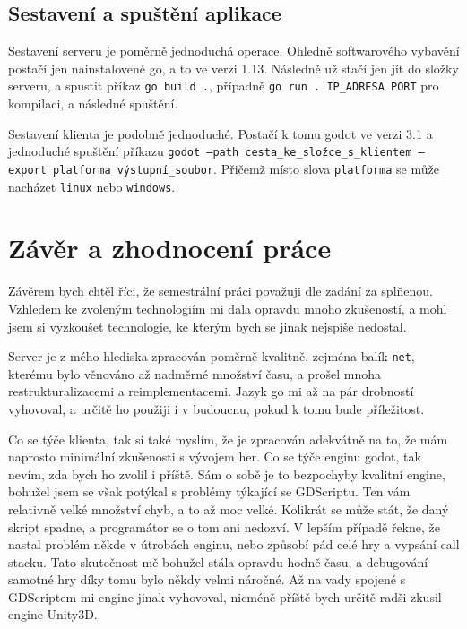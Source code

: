 \documentclass[12pt, a4paper]{article}
\begin{document}
    \subsection{Sestavení a spuštění aplikace}
    Sestavení serveru je poměrně jednoduchá operace.
    Ohledně softwarového vybavění postačí jen nainstalovené go, a to ve verzi 1.13.
    Následně už stačí jen jít do složky serveru, a spustit příkaz \texttt{go build .}, případně \texttt{go run . IP\_ADRESA PORT} pro kompilaci, a následné spuštění.

    Sestavení klienta je podobně jednoduché.
    Postačí k tomu godot ve verzi 3.1 a jednoduché spuštění příkazu \texttt{godot --path cesta\_ke\_složce\_s\_klientem --export platforma výstupní\_soubor}.
    Přičemž místo slova \texttt{platforma} se může nacházet \texttt{linux} nebo \texttt{windows}.

    \section{Závěr a zhodnocení práce}
    Závěrem bych chtěl říci, že semestrální práci považuji dle zadání za splňenou.
    Vzhledem ke zvoleným technologiím mi dala opravdu mnoho zkušeností, a mohl jsem si vyzkoušet technologie, ke kterým bych se jinak nejspíše nedostal.

    Server je z mého hlediska zpracován poměrně kvalitně, zejména balík \texttt{net}, kterému bylo věnováno až nadměrné množství času, a prošel mnoha restrukturalizacemi a reimplementacemi.
    Jazyk go mi až na pár drobností vyhovoval, a určitě ho použiji i v budoucnu, pokud k tomu bude příležitost.

    Co se týče klienta, tak si také myslím, že je zpracován adekvátně na to, že mám naprosto minimální zkušenosti s vývojem her.
    Co se týče enginu godot, tak nevím, zda bych ho zvolil i příště.
    Sám o sobě je to bezpochyby kvalitní engine, bohužel jsem se však potýkal s problémy týkající se GDScriptu.
    Ten vám  relativně velké množství chyb, a to až moc velké.
    Kolikrát se může stát, že daný skript spadne, a programátor se o tom ani nedozví.
    V lepším případě řekne, že nastal problém někde v útrobách enginu, nebo způsobí pád celé hry a vypsání call stacku.
    Tato skutečnost mě bohužel stála opravdu hodně času, a debugování samotné hry díky tomu bylo někdy velmi náročné.
    Až na vady spojené s GDScriptem mi engine jinak vyhovoval, nicméně příště bych určitě radši zkusil engine Unity3D.

    \newpage
    \listoftables

    \newpage
    \listoffigures
\end{document}
